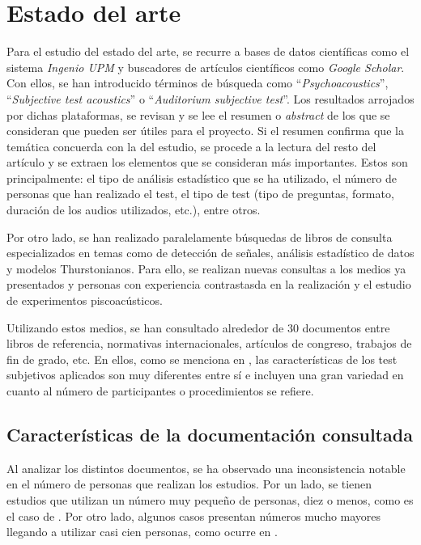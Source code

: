 \documentclass[11pt,a4paper]{book}
\author{Víctor de Tejada Molera}
\begin{document}
\chapter{Estado del arte}
    Para el estudio del estado del arte, se recurre a bases de datos científicas como el sistema \textit{Ingenio UPM} y buscadores de artículos científicos como \textit{Google Scholar}. Con ellos, se han introducido términos de búsqueda como ``\textit{Psychoacoustics}'', ``\textit{Subjective test acoustics}'' o ``\textit{Auditorium subjective test}''. Los resultados arrojados por dichas plataformas, se revisan y se lee el resumen o \textit{abstract} de los que se consideran que pueden ser útiles para el proyecto. Si el resumen confirma que la temática concuerda con la del estudio, se procede a la lectura del resto del artículo y se extraen los elementos que se consideran más importantes. Estos son principalmente: el tipo de análisis estadístico que se ha utilizado, el número de personas que han realizado el test, el tipo de test (tipo de preguntas, formato, duración de los audios utilizados, etc.), entre otros.
    
    Por otro lado, se han realizado paralelamente búsquedas de libros de consulta especializados en temas como de detección de señales, análisis estadístico de datos y modelos Thurstonianos. Para ello, se realizan nuevas consultas a los medios ya presentados y personas con experiencia contrastasda en la realización y el estudio de experimentos piscoacústicos.\newline
    
    Utilizando estos medios, se han consultado alrededor de 30 documentos entre libros de referencia, normativas internacionales, artículos de congreso, trabajos de fin de grado, etc. En ellos, como se menciona en \cite{Tejada2020}, las características de los test subjetivos aplicados son muy diferentes entre sí e incluyen una gran variedad en cuanto al número de participantes o procedimientos se refiere.
    
    \section{Características de la documentación consultada}
    
    Al analizar los distintos documentos, se ha observado una inconsistencia notable en el número de personas que realizan los estudios. Por un lado, se tienen estudios que utilizan un número muy pequeño de personas, diez o menos, como es el caso de \cite{2019MNowak}. Por otro lado, algunos casos presentan números mucho mayores llegando a utilizar casi cien personas, como ocurre en \cite{1954JEgan}. 
    
\end{document}
